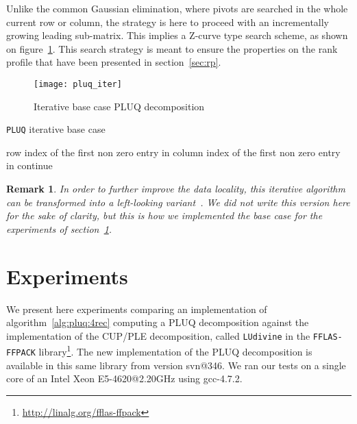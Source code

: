 \documentclass{article}
\newcommand{\pluq}{\texttt{PLUQ}\xspace}
\newtheorem{remark}{Remark}
\begin{document}
Unlike the common Gaussian elimination, where pivots are searched in the whole
current row or column, the strategy is here to proceed with an incrementally growing
leading sub-matrix. This implies a Z-curve type search scheme, as shown on
figure~\ref{fig:iter}.
This search strategy is meant to ensure the properties on the rank profile that
have been presented in section~\ref{sec:rp}.
\begin{figure}[h]
\begin{center}
  \texttt{[image: pluq\_iter]}
\end{center}
  \caption{Iterative base case PLUQ decomposition}
\label{fig:iter}  
\end{figure}

{\scriptsize
\begin{algorithm}[H]
  \caption{\pluq iterative base case}
  \label{alg:pluq:iter}
\begin{algorithmic}

\State 
{}
\State {}
        \State  row index of the first non zero entry in 
        \State 
        \State  column index of the first non zero entry in 
        \State 
    \State 
    \State 
    \Else
    \State 
    \State continue
    \EndIf
    \For{}
      \State 
      \State 
    \EndFor
    \State 
    \State  {}
    \State  {}
    \State 
\EndWhile
\end{algorithmic}
\end{algorithm}
}

\begin{remark}
In order to further improve the data locality, this iterative
algorithm can be transformed into a left-looking
variant~\cite{DonDufSorVor98}. We did not write this version here for
the sake of clarity, but this is how we implemented the base case for
the experiments of section~\ref{sec:exp}.
\end{remark}
 \section{Experiments}\label{sec:exp}
We present here experiments comparing an implementation of
algorithm~\ref{alg:pluq:4rec} computing a PLUQ decomposition against the
implementation of the CUP/PLE decomposition, called \texttt{LUdivine} in the 
\texttt{FFLAS-FFPACK} library\footnote{\url{http://linalg.org/fflas-ffpack}}.
The new implementation of the PLUQ
decomposition is available in this same library from version svn@346.
We ran our tests on a single core of an Intel Xeon
E5-4620@2.20GHz using gcc-4.7.2.
\end{document}
